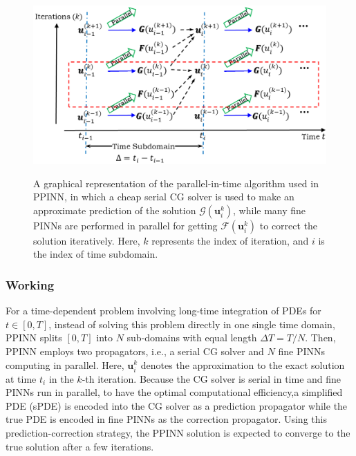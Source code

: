 \documentclass[conference,compsoc]{IEEEtran}
\begin{document}
\begin{figure}
  \centering
  \includegraphics[scale=0.6]{figures/Figure2b.png}\\
  \caption{A graphical representation of the parallel-in-time algorithm used in PPINN, in which a cheap serial CG solver is used to make an approximate prediction of the solution $\mathcal{G}(\mathbf{u}_i^k)$, while many fine PINNs are performed in parallel for getting $\mathcal{F}(\mathbf{u}_i^k)$ to correct the solution iteratively. Here, $k$ represents the index of iteration, and $i$ is the index of time subdomain.\cite{meng2020ppinn}}
\end{figure}

\subsubsection{Working}
For a time-dependent problem involving long-time integration of PDEs for $t\in [0,T]$, instead of solving this problem directly in one single time domain, PPINN splits $[0,T]$ into $N$ sub-domains with equal length $\Delta T = T/N$. Then, PPINN employs two propagators, i.e., a serial CG solver and $N$ fine PINNs computing in parallel\cite{meng2020ppinn}. Here, $\mathbf{u}_{i}^k$ denotes the approximation to the exact solution at time $t_i$ in the $k$-{th} iteration. Because the CG solver is serial in time and fine PINNs run in parallel, to have the optimal computational efficiency,a simplified PDE (sPDE) is encoded into the CG solver as a prediction propagator while the true PDE is encoded in fine PINNs as the correction propagator\cite{meng2020ppinn}.
Using this prediction-correction strategy, the PPINN solution is expected to converge to the true solution after a few iterations.
\end{document}
